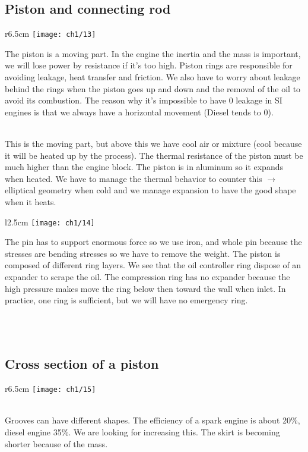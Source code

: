 		\subsection{Piston and connecting rod}
			\begin{wrapfigure}[11]{r}{6.5cm}
			\vspace{-12mm}
			\texttt{[image: ch1/13]}
			\end{wrapfigure}
			The piston is a moving part. In the engine the inertia and the mass is important, we will lose power by resistance if it's too high. Piston rings are responsible for avoiding leakage, heat transfer and friction. We also have to worry about leakage behind the rings when the piston goes up and down and the removal of the oil to avoid its combustion. The reason why it's impossible to have 0 leakage in SI engines is that we always have a horizontal movement (Diesel tends to 0).
			
			 \ \\ This is the moving part, but above this we have cool air or mixture (cool because it will be heated up by the process). The thermal resistance of the piston must be much higher than the engine block. The piston is in aluminum so it expands when heated. We have to manage the thermal behavior to counter this $\rightarrow$ elliptical geometry when cold and we manage expansion to have the good shape when it heats. \\
			
			\begin{wrapfigure}[8]{l}{2.5cm}
			\vspace{-9mm}
			\texttt{[image: ch1/14]}
			\end{wrapfigure}
The pin has to support enormous force so we use iron, and whole pin because the stresses are bending stresses so we have to remove the weight. The piston is composed of different ring layers. We see that the oil controller ring dispose of an expander to scrape the oil. The compression ring has no expander because the high pressure makes move the ring below then toward the wall when inlet. In practice, one ring is sufficient, but we will have no emergency ring. 

\ \\\\
		\subsection{Cross section of a piston}
			\begin{wrapfigure}[5]{r}{6.5cm}
			\vspace{-15mm}
			\texttt{[image: ch1/15]}
			\end{wrapfigure}
			\ \\ Grooves can have different shapes. The efficiency of a spark engine is about 20\%, diesel engine 35\%. We are looking for increasing this. The skirt is becoming shorter because of the mass. 
			
